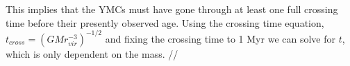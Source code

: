 This implies that the YMCs must have gone through at least one full crossing time before their presently observed age. Using the crossing time equation, $t_{cross}=(GMr_{vir}^{-3})^{-1/2}$ and fixing the crossing time to 1 Myr we can solve for $t$, which is only dependent on the mass. \cite{Arce_1999}//
